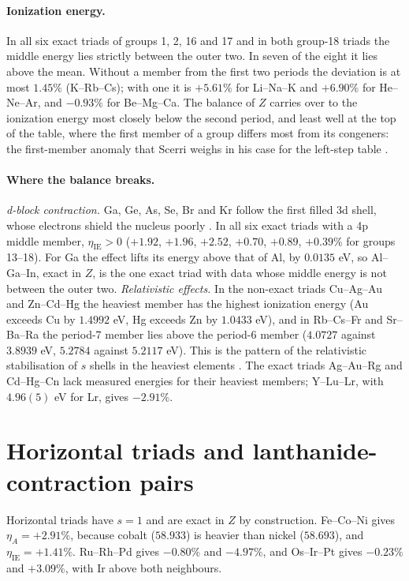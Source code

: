 \documentclass[11pt]{article}
\theoremstyle{definition}\newtheorem{definition}[theorem]{Definition}
\theoremstyle{remark}\newtheorem{remark}[theorem]{Remark}
\begin{document}
\paragraph{Ionization energy.} In all six exact triads of groups 1, 2, 16 and 17 and in both group-18 triads the middle energy lies strictly between the outer two. In seven of the eight it lies above the mean. Without a member from the first two periods the deviation is at most $1.45\%$ (K--Rb--Cs); with one it is $+5.61\%$ for Li--Na--K and $+6.90\%$ for He--Ne--Ar, and $-0.93\%$ for Be--Mg--Ca. The balance of $Z$ carries over to the ionization energy most closely below the second period, and least well at the top of the table, where the first member of a group differs most from its congeners: the first-member anomaly that Scerri weighs in his case for the left-step table \cite{Scerri2022}.

\paragraph{Where the balance breaks.} \emph{d-block contraction.} Ga, Ge, As, Se, Br and Kr follow the first filled 3d shell, whose electrons shield the nucleus poorly \cite{GE}. In all six exact triads with a 4p middle member, $\eta_{\mathrm{IE}}>0$ ($+1.92$, $+1.96$, $+2.52$, $+0.70$, $+0.89$, $+0.39\%$ for groups 13--18). For Ga the effect lifts its energy above that of Al, by $0.0135$ eV, so Al--Ga--In, exact in $Z$, is the one exact triad with data whose middle energy is not between the outer two. \emph{Relativistic effects.} In the non-exact triads Cu--Ag--Au and Zn--Cd--Hg the heaviest member has the highest ionization energy (Au exceeds Cu by $1.4992$ eV, Hg exceeds Zn by $1.0433$ eV), and in Rb--Cs--Fr and Sr--Ba--Ra the period-7 member lies above the period-6 member ($4.0727$ against $3.8939$ eV, $5.2784$ against $5.2117$ eV). This is the pattern of the relativistic stabilisation of $s$ shells in the heaviest elements \cite{Pyykko1988}. The exact triads Ag--Au--Rg and Cd--Hg--Cn lack measured energies for their heaviest members; Y--Lu--Lr, with $4.96(5)$ eV for Lr, gives $-2.91\%$.

\section{Horizontal triads and lanthanide-contraction pairs}\label{sec:explore}
Horizontal triads have $s=1$ and are exact in $Z$ by construction. Fe--Co--Ni gives $\eta_A=+2.91\%$, because cobalt ($58.933$) is heavier than nickel ($58.693$), and $\eta_{\mathrm{IE}}=+1.41\%$. Ru--Rh--Pd gives $-0.80\%$ and $-4.97\%$, and Os--Ir--Pt gives $-0.23\%$ and $+3.09\%$, with Ir above both neighbours.
\end{document}
